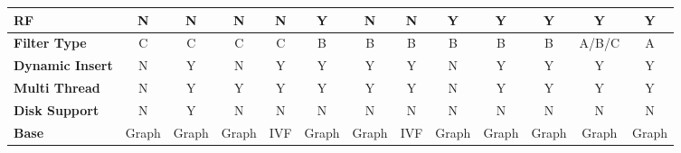 \documentclass[sigconf, nonacm]{acmart}
\begin{document}
\begin{table}[t]
\begin{tabular}{|l|l|*{12}{c|}}
		\multicolumn{2}{|l|}{\textbf{RF}}             & N & N & N & N & Y & N & N & Y & Y & Y & Y & Y \\ \hline
		\multicolumn{2}{|l|}{\textbf{Filter Type }}             & C & C & C & C & B & B & B & B & B & B & A/B/C & A \\ \hline
		\multicolumn{2}{|l|}{\textbf{Dynamic Insert}} & N & Y & N & Y & Y & Y & Y & N & Y & Y & Y & Y \\ \hline
		\multicolumn{2}{|l|}{\textbf{Multi Thread}}   & N & Y & Y & Y & Y & Y & Y & N & Y & Y & Y & Y \\ \hline
		\multicolumn{2}{|l|}{\textbf{Disk Support}}           &N  & Y& N & N & N & N & N & N & N & N & N & N \\ \hline
		\multicolumn{2}{|l|}{\textbf{Base}}           & Graph & Graph & Graph & IVF & Graph & Graph & IVF & Graph & Graph & Graph & Graph & Graph \\ \hline
	\end{tabular}
	
	
	
	\centering
	\footnotesize{
		\begin{minipage}{\linewidth}
			\vspace{0.1cm}
		

\end{minipage}}
\end{table}
\end{document}
